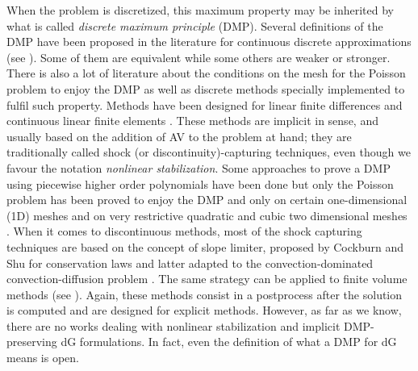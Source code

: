 When the problem is discretized, this maximum property may be inherited by what is called \textit{discrete maximum principle} (DMP). Several definitions of the DMP have been proposed in the literature for continuous discrete approximations (see \cite{codina_discontinuity-capturing_1993,hohn_remarks_1981,varga_discrete_1966,burman_edge_2004,roos2008robust}). Some of them are equivalent while some others are weaker or stronger. There is also a lot of literature about the conditions on the mesh for the Poisson problem to enjoy the DMP \cite{hohn_remarks_1981,vejchodsky_discrete_2007,horvath_discrete_2013,payette_performance_2012} as well as discrete methods specially implemented to fulfil such property. Methods have been designed for linear finite differences \cite{ciarlet_discrete_1970} and continuous linear finite elements \cite{ciarlet_maximum_1973,codina_discontinuity-capturing_1993,mizukami_petrov-galerkin_1985,burman_discrete_2004,burman_edge_2004,burman2005stabilized}. {These methods are implicit in sense, and usually based on the addition of AV to the problem at hand; they are traditionally called shock (or discontinuity)-capturing techniques, even though we favour the notation \emph{nonlinear stabilization}.} 
Some approaches to prove a DMP using piecewise higher order polynomials have been done \cite{nagarajan_enforcing_2011,payette_performance_2012,kuzmin_design_2008,vejchodsky_discrete_2007,vejchodsky_higher-order_2010,yanik_discrete_1987,yanik_sufficient_1989} but only the Poisson problem has been proved to enjoy the DMP and only on certain one-dimensional (1D) meshes \cite{vejchodsky_discrete_2007} and on very restrictive quadratic and cubic two dimensional meshes \cite{lorenz_zur_1977,hohn_remarks_1981}. When it comes to discontinuous methods, most of the shock capturing techniques are based on the concept of slope limiter, proposed by Cockburn and Shu for conservation laws \cite{cockburn_rungekutta_1998,cockburn_runge-kutta_1990} and latter adapted to the convection-dominated convection-diffusion problem  \cite{cockburn_rungekutta_2001}. The same strategy can be applied to finite volume methods (see \cite{zhang_maximum-principle-satisfying_2010,zhang_maximum-principle-satisfying_2011,zhang_maximum-principle-satisfying_2012}). Again, these methods consist in a postprocess after the solution is computed and are designed for explicit methods. {However, as far as we know, there are no works dealing with nonlinear stabilization and implicit DMP-preserving dG formulations. In fact, even the definition of what a DMP for dG means is open.}

